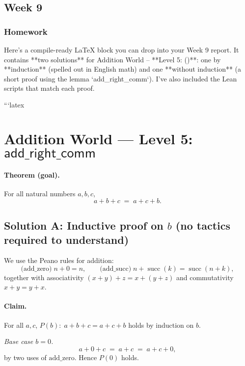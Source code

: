 \documentclass{article}
\theoremstyle{theorem}
\theoremstyle{definition}
\theoremstyle{remark}
\begin{document}
\subsection{Week 9}

\subsubsection{Homework}

Here’s a compile-ready LaTeX block you can drop into your Week 9 report. It contains **two solutions** for Addition World – **Level 5: ()**: one by **induction** (spelled out in English math) and one **without induction** (a short proof using the lemma `add_right_comm`). I’ve also included the Lean scripts that match each proof.

```latex
\section*{Addition World — Level 5: \texorpdfstring{$\mathsf{add\_right\_comm}$}{add\_right\_comm}}

\paragraph{Theorem (goal).}
For all natural numbers \(a,b,c\),
\[
a + b + c \;=\; a + c + b .
\]

\subsection*{Solution A: Inductive proof on \texorpdfstring{$b$}{b} (no tactics required to understand)}
We use the Peano rules for addition:
\[
\text{(add\_zero)}\; n+0=n,\qquad
\text{(add\_succ)}\; n+\operatorname{succ}(k)=\operatorname{succ}(n+k),
\]
together with associativity \((x+y)+z=x+(y+z)\) and commutativity \(x+y=y+x\).

\paragraph{Claim.} For all \(a,c\), \(P(b):\; a+b+c=a+c+b\) holds by induction on \(b\).

\emph{Base case \(b=0\).}
\[
a+0+c \;=\; a+c \;=\; a+c+0,
\]
by two uses of \(\text{add\_zero}\). Hence \(P(0)\) holds.
\end{document}
